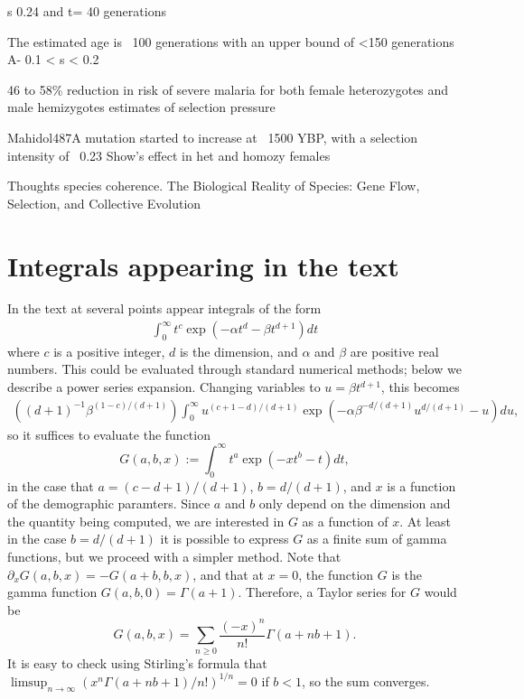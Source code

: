 \documentclass{article}
\begin{document}
s 0.24 and t= 40 generations \citep{Slatkin-age-est}

The estimated age is ~100 generations with an upper bound of <150
generations A- 0.1 < s < 0.2 \citep{Saunders-g6pd}

46 to 58\% reduction in risk of severe malaria for both female heterozygotes and male hemizygotes estimates of selection pressure \citep{Ruwende-g6pd}

Mahidol487A mutation started to increase at ~1500 YBP, with a
selection intensity of ~0.23 \citep{Louicharoen-g6pd}
Show's effect in het and homozy females

Thoughts
species coherence.
The Biological Reality of Species: Gene Flow, Selection, and Collective Evolution




\appendix

\section{Integrals appearing in the text}
    \label{apx:integrals}

In the text at several points appear integrals of the form
\begin{align}
  \int_0^\infty t^c \exp \left( - \alpha t^d - \beta t^{d+1} \right) dt 
\end{align}
where $c$ is a positive integer, $d$ is the dimension, and $\alpha$ and $\beta$ are positive real numbers.
This could be evaluated through standard numerical methods; below we describe a power series expansion.
Changing variables to $u = \beta t^{d+1}$, this becomes
\begin{align}
    \left( (d+1)^{-1} \beta^{ (1-c)/(d+1) } \right) \int_0^\infty u^{(c+1-d)/(d+1)} \exp\left( - \alpha \beta^{-d/(d+1)} u^{d/(d+1)} - u \right) du ,
\end{align}
so it suffices to evaluate the function
\begin{equation}
    G(a,b,x) := \int_0^\infty  t^a \exp\left( -x t^b - t \right) dt ,
\end{equation}
in the case that $a=(c-d+1)/(d+1)$, $b=d/(d+1)$, and $x$ is a function of the demographic paramters.
Since $a$ and $b$ only depend on the dimension and the quantity being computed,
we are interested in $G$ as a function of $x$.
At least in the case $b=d/(d+1)$ it is possible to express $G$ as a finite sum of gamma functions,
but we proceed with a simpler method.
Note that $\partial_x G(a,b,x) = -G(a+b,b,x)$,
and that at $x=0$, the function $G$ is the gamma function $G(a,b,0) = \Gamma(a+1)$.
Therefore, a Taylor series for $G$ would be
\[
    G(a,b,x) = \sum_{n \ge 0} \frac{(-x)^n}{n!} \Gamma(a+nb+1) .
\]
It is easy to check using Stirling's formula that $\limsup_{n \to \infty} ( x^n \Gamma(a+nb+1)/n! )^{1/n} = 0$
if $b<1$, so the sum converges.
\end{document}
